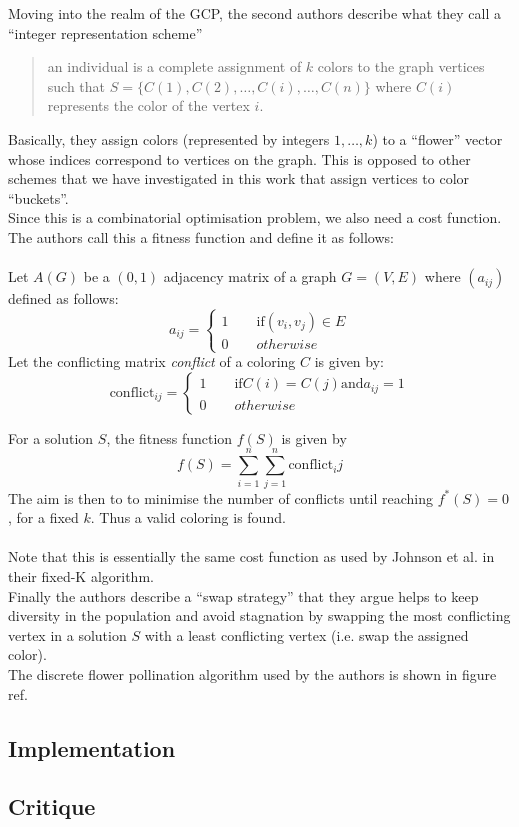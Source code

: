 Moving into the realm of the GCP, the second authors describe what they call a ``integer representation scheme''
\begin{quotation}
an individual is a complete assignment of $k$ colors to the graph vertices such that $S = \{ C(1),C(2),\ldots,C(i),\ldots,C(n) \}$ where $C(i)$ represents the color of the vertex $i$.
\end{quotation}
Basically, they assign colors (represented by integers $1,\ldots,k$) to a ``flower'' vector whose indices correspond to vertices on the graph. This is opposed to other schemes that we have investigated in this work that assign vertices to color ``buckets''.\\
Since this is a combinatorial optimisation problem, we also need a cost function. The authors call this a fitness function and define it as follows:\\~\\
Let $A(G)$ be a $(0,1)$ adjacency matrix of a graph $G = (V,E)$ where $(a_{ij})$ defined as follows:
\begin{equation}
a_{ij} = \begin{cases}
1 \qquad \text{if} (v_i,v_j) \in E\\
0 \qquad otherwise
\end{cases}
\end{equation}
Let the conflicting matrix \emph{conflict} of a coloring $C$ is given by:
\begin{equation}
\text{conflict}_{ij} = \begin{cases}
1 \qquad \text{if} C(i)=C(j) \text{and} a_{ij}=1\\
0 \qquad otherwise
\end{cases}
\end{equation}

For a solution $S$, the fitness function $f(S)$ is given by
\begin{equation}
f(S) = \displaystyle \sum_{i=1}^{n} \sum_{j=1}^{n} \text{conflict}_ij
\end{equation}
The aim is then to to minimise the number of conflicts until reaching $f^*(S) = 0$, for a fixed $k$. Thus a valid coloring is found.\\~\\

Note that this is essentially the same cost function as used by Johnson et al. in their fixed-K algorithm.\\
Finally the authors describe a ``swap strategy'' that they argue helps to keep diversity in the population and avoid stagnation by swapping the most conflicting vertex in a solution $S$ with a least conflicting vertex (i.e. swap the assigned color).\\
The discrete flower pollination algorithm used by the authors is shown in figure ref{}.


\subsection{Implementation}

\subsection{Critique}


